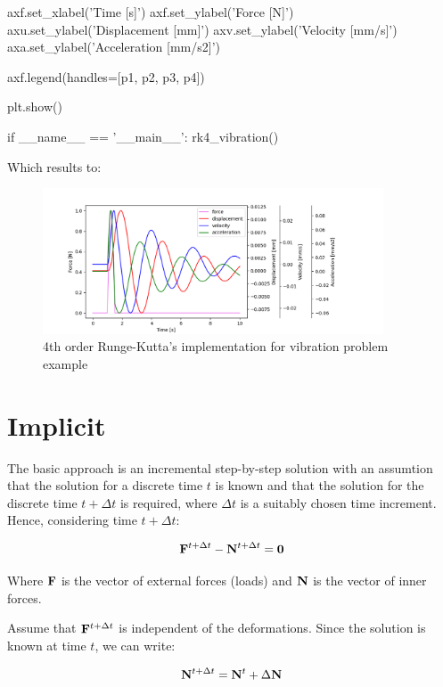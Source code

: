 \begin{python}
    axf.set_xlabel('Time [s]')
    axf.set_ylabel('Force [N]')
    axu.set_ylabel('Displacement [mm]')
    axv.set_ylabel('Velocity [mm/s]')
    axa.set_ylabel('Acceleration [mm/s2]')

    axf.legend(handles=[p1, p2, p3, p4])

    plt.show()

if __name__ == '__main__':
    rk4_vibration()

\end{python}

Which results to:
\begin{figure}[ht]
    \centering
    \includegraphics[width=0.90\textwidth]{img/rk4_example.png}
    \caption{4th order Runge-Kutta's implementation for vibration problem example}
    \label{fig:rk4-example-png}
\end{figure}



\newpage
\section{Implicit}

The basic approach is an incremental step-by-step solution with an assumtion
that the solution for a discrete time $ t $ is known and that the solution for
the discrete time $ t + \Delta t $ is required, where $ \Delta t $ is
a suitably chosen time increment. Hence, considering time $ t + \Delta t $:

\begin{equation}\label{implicit-equation}
    \mathbf{F}^{t + \Delta t} - \mathbf{N}^{t + \Delta t} = \mathbf{0}
\end{equation}

Where $ \mathbf{F} $ is the vector of external forces (loads) and $ \mathbf{N} $
is the vector of inner forces.

Assume that $ \mathbf{F}^{t + \Delta t} $ is independent of the deformations.
Since the solution is known at time $ t $, we can write:

\begin{equation}
    \mathbf{N}^{t+\Delta t} = \mathbf{N}^t + \Delta \mathbf{N}
\end{equation}

